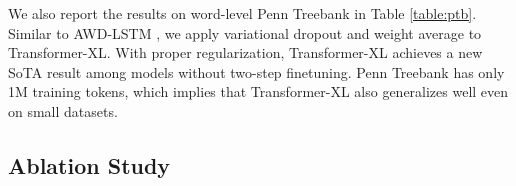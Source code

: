 
We also report the results on word-level Penn Treebank in Table \ref{table:ptb}. Similar to AWD-LSTM \citep{merity2017regularizing}, we apply variational dropout and weight average to Transformer-XL. With proper regularization, Transformer-XL achieves a new SoTA result among models without two-step finetuning. Penn Treebank has only 1M training tokens, which implies that Transformer-XL also generalizes well even on small datasets.

\subsection{Ablation Study}


